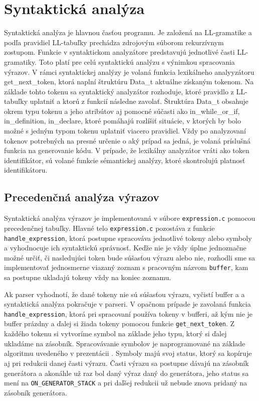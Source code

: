 \documentclass [11pt, a4paper]{article}
\begin{document}
\section{Syntaktická analýza}
Syntaktická analýza je hlavnou časťou programu.
Je založená na LL-gramatike a podľa pravidiel LL-tabuľky prechádza zdrojovým súborom rekurzívnym zostupom. Funkcie v syntaktickom analyzátore predstavujú jednotlivé časti LL-gramatiky. Toto platí pre celú syntaktickú analýzu s výnimkou spracovania výrazov. V rámci syntaktickej analýzy je volaná funkcia lexikálneho analyyzátoru get_next_token, ktorá naplní štruktúru Data_t aktuálne získaným tokenom. Na základe tohto tokenu sa syntaktický analyzátor rozhoduje, ktoré pravidlo z LL-tabuľky uplatniť a ktorú z funkcií následne zavolať.
Štruktúra Data_t obsahuje okrem typu tokenu a jeho atribútov aj pomocné súčasti ako in_while_or_if, in_definition, in_declare, ktoré pomáhajú rozlíšiť situácie, v ktorých by bolo možné s jedným typom tokenu uplatniť viacero pravidiel. Vždy po analyzovaní tokenov potrebných na presné určenie o aký prípad sa jedná, je volaná príslušná funkcia na generovanie kódu. 
V prípade, že lexikálny analyzátor vráti ako token identifikátor, sú volané funkcie sémantickej analýzy, ktoré skontrolujú platnosť identifikátoru.


\subsection{Precedenčná analýza výrazov}
Syntaktická analýza výrazov je implementovaná v súbore \texttt{expression.c} pomocou precedenčnej tabuľky. Hlavné telo \texttt{expression.c} pozostáva z funkcie \texttt{handle\_expression}, ktorá postupne spracováva jednotlivé tokeny alebo symboly a vyhodnocuje ich syntaktickú správnosť. Keďže nie je vždy úplne jednoznačne možné určiť, či nasledujúci token bude súšasťou výrazu alebo nie, rozhodli sme sa implementovať jednosmerne viazaný zoznam s pracovným názvom \texttt{buffer}, kam sa postupne ukladajú tokeny vždy na koniec zoznamu.

 Ak parser vyhodnotí, že dané tokeny nie sú súšasťou výrazu, vyčistí buffer a a syntaktická analýza pokračuje v parseri. V opačnom prípade je zavolaná funkcia \texttt{handle\_expression}, ktorá pri spracovaní používa tokeny v bufferi, až kým nie je buffer prázdny a ďalej si žiada tokeny pomocou funkcie \texttt{get\_next\_token}. Z každého tokenu si vytvoríme symbol na základe jeho typu, ktorý si ďalej ukladáme na zásobník. Spracovávanie symbolov je naprogramované na základe algoritmu uvedeného v prezentácii \cite{IFJpred}. Symboly majú svoj status, ktorý sa kopíruje aj pri redukcii danej časti výrazu. Časti výrazu sa postupne dávajú na zásobník generátora a akonáhle už raz bol daný výraz daný do generátora, jeho status sa mení na \texttt{ON\_GENERATOR\_STACK} a pri daľšej redukcii už nebude znova pridaný na zásobník generátora. 
\end{document}
